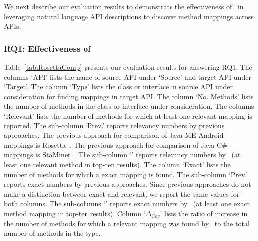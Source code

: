 We next describe our evaluation results to demonstrate the effectiveness of \tool\ in leveraging natural language API descriptions to discover method mappings across APIs.

\subsubsection{RQ1: Effectiveness of \tool\ }

Table~\ref{tab:RosettaComp} presents our evaluation results for answering RQ1. 
The columns `API' lists the name of source API under `Source' and target API under `Target'. 
The column `Type' lists the class or interface in source API
under consideration for finding mappings in target API.
The column `No. Methods' lists the number of methods in the class or interface under consideration.
The columns `Relevant' lists the number of methods for which at least one relevant mapping is reported.
The sub-column `Prev.' reports relevancy numbers by previous approaches.
The previous approach for comparison of Java ME-Android mappings is Rosetta~\cite{Gokhale2013ICSE}.
The previous approach for comparison of Java-C\# mappings is StaMiner~\cite{nguyen2014statistical}.
The sub-column `\tool' reports relevancy numbers by \tool\ (at least one relevant method in top-ten results).
The column `Exact' lists the number of methods for which a exact mapping is found.
The sub-column `Prev.' reports exact numbers by previous approaches.
Since previous approaches do not make a distinction between exact and relevant, we report the same values for both columns.
The sub-columns `\tool' reports exact numbers by \tool\ (at least one exact method mapping in top-ten results).
Column `$\Delta_{Cov}$' lists the ratio of increase in the number of methods for which a relevant mapping was found by \tool\ to the total number of methods in the type.


